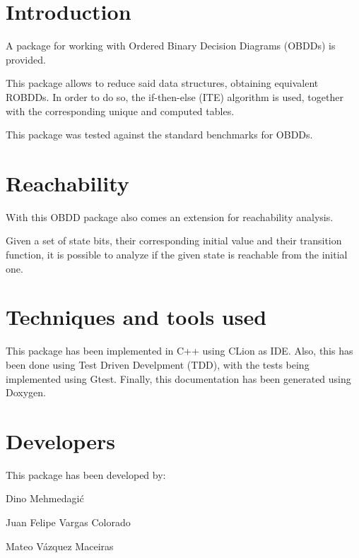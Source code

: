 \hypertarget{index_intro_sec}{}\section{Introduction}\label{index_intro_sec}
A package for working with Ordered Binary Decision Diagrams (O\+B\+D\+Ds) is provided.

This package allows to reduce said data structures, obtaining equivalent R\+O\+B\+D\+Ds. In order to do so, the if-\/then-\/else (I\+TE) algorithm is used, together with the corresponding unique and computed tables.

This package was tested against the standard benchmarks for O\+B\+D\+Ds.\hypertarget{index_ext_sec}{}\section{Reachability}\label{index_ext_sec}
With this O\+B\+DD package also comes an extension for reachability analysis.

Given a set of state bits, their corresponding initial value and their transition function, it is possible to analyze if the given state is reachable from the initial one.\hypertarget{index_used_sec}{}\section{Techniques and tools used}\label{index_used_sec}
This package has been implemented in C++ using C\+Lion as I\+DE. Also, this has been done using Test Driven Develpment (T\+DD), with the tests being implemented using Gtest. Finally, this documentation has been generated using Doxygen.\hypertarget{index_devs_sec}{}\section{Developers}\label{index_devs_sec}
This package has been developed by\+:
\begin{DoxyItemize}
\item Dino Mehmedagić
\item Juan Felipe Vargas Colorado
\item Mateo Vázquez Maceiras 
\end{DoxyItemize}